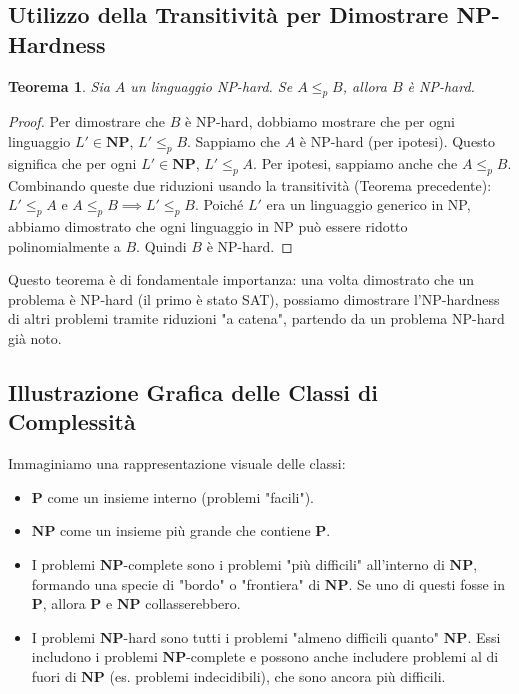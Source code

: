 \documentclass[a4paper, 11pt]{book} %
\newtheorem{theorem}{Teorema}[section]
\theoremstyle{definition}
\begin{document}
\subsection{Utilizzo della Transitivit\`a per Dimostrare NP-Hardness}

\begin{theorem}
Sia $A$ un linguaggio NP-hard. Se $A \le_p B$, allora $B$ è NP-hard.
\end{theorem}

\begin{proof}
Per dimostrare che $B$ è NP-hard, dobbiamo mostrare che per ogni linguaggio $L' \in \mathbf{NP}$, $L' \le_p B$.
Sappiamo che $A$ è NP-hard (per ipotesi). Questo significa che per ogni $L' \in \mathbf{NP}$, $L' \le_p A$.
Per ipotesi, sappiamo anche che $A \le_p B$.
Combinando queste due riduzioni usando la transitività (Teorema precedente): $L' \le_p A$ e $A \le_p B \implies L' \le_p B$.
Poiché $L'$ era un linguaggio generico in NP, abbiamo dimostrato che ogni linguaggio in NP può essere ridotto polinomialmente a $B$. Quindi $B$ è NP-hard.
\end{proof}

Questo teorema è di fondamentale importanza: una volta dimostrato che un problema è NP-hard (il primo è stato SAT), possiamo dimostrare l'NP-hardness di altri problemi tramite riduzioni "a catena", partendo da un problema NP-hard già noto.

\subsection{Illustrazione Grafica delle Classi di Complessità}

Immaginiamo una rappresentazione visuale delle classi:
\begin{itemize}
    \item $\mathbf{P}$ come un insieme interno (problemi "facili").
    \item $\mathbf{NP}$ come un insieme più grande che contiene $\mathbf{P}$.
    \item I problemi $\mathbf{NP}$-complete sono i problemi "più difficili" all'interno di $\mathbf{NP}$, formando una specie di "bordo" o "frontiera" di $\mathbf{NP}$. Se uno di questi fosse in $\mathbf{P}$, allora $\mathbf{P}$ e $\mathbf{NP}$ collasserebbero.
    \item I problemi $\mathbf{NP}$-hard sono tutti i problemi "almeno difficili quanto" $\mathbf{NP}$. Essi includono i problemi $\mathbf{NP}$-complete e possono anche includere problemi al di fuori di $\mathbf{NP}$ (es. problemi indecidibili), che sono ancora più difficili.
\end{itemize}
\end{document}
